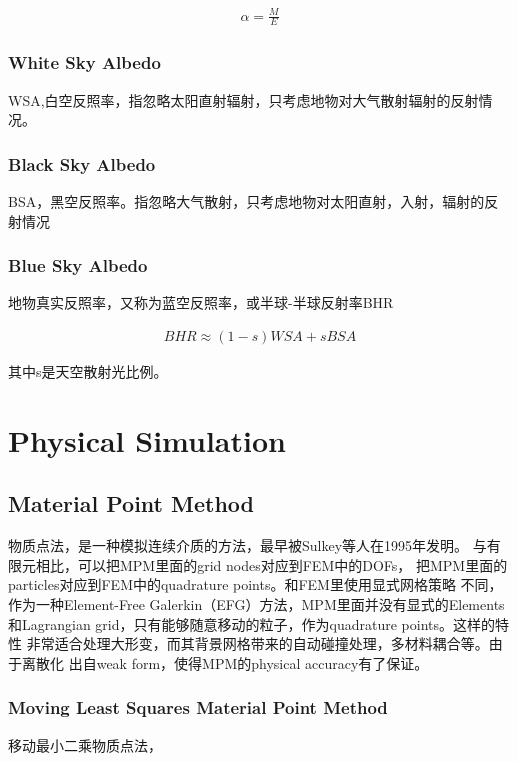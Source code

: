 \begin{align*}
    \alpha = \frac{M}{E}
\end{align*}

\subsection{White Sky Albedo}

WSA,白空反照率，指忽略太阳直射辐射，只考虑地物对大气散射辐射的反射情况。

\subsection{Black Sky Albedo}

BSA，黑空反照率。指忽略大气散射，只考虑地物对太阳直射，入射，辐射的反射情况

\subsection{Blue Sky Albedo}

地物真实反照率，又称为蓝空反照率，或半球-半球反射率BHR

\begin{align*}
    BHR \approx (1-s)WSA + sBSA 
\end{align*}

其中s是天空散射光比例。


\chapter{Physical Simulation}

\section{Material Point Method}

物质点法，是一种模拟连续介质的方法，最早被Sulkey等人在1995年发明。
与有限元相比，可以把MPM里面的grid nodes对应到FEM中的DOFs，
把MPM里面的particles对应到FEM中的quadrature points。和FEM里使用显式网格策略
不同，作为一种Element-Free Galerkin（EFG）方法，MPM里面并没有显式的Elements
和Lagrangian grid，只有能够随意移动的粒子，作为quadrature points。这样的特性
非常适合处理大形变，而其背景网格带来的自动碰撞处理，多材料耦合等。由于离散化
出自weak form，使得MPM的physical accuracy有了保证。

\subsection{Moving Least Squares Material Point Method}

移动最小二乘物质点法，

